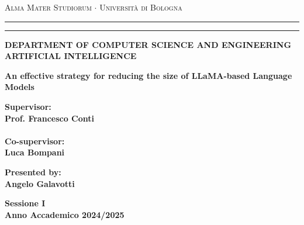 \documentclass[12pt,a4paper,openright,twoside]{report}
\begin{document}
\begin{titlepage}
	\begin{center}
		{{\Large{\textsc{Alma Mater Studiorum $\cdot$ Università di
							Bologna}}}} \rule[0.1cm]{15.8cm}{0.1mm}
		\rule[0.5cm]{15.8cm}{0.6mm}
		{\small{\bf DEPARTMENT OF COMPUTER SCIENCE
		AND ENGINEERING\\
		ARTIFICIAL INTELLIGENCE }}
	\end{center}
	\vspace{15mm}
	\begin{center}
		{\LARGE{\bf An effective strategy for reducing the size of LLaMA-based Language Models}}\\
		\vspace{3mm}
	\end{center}
	\vspace{40mm}
	\par
	\noindent
	\begin{minipage}[t]{0.47\textwidth}
		{\large{\bf Supervisor:\\
				Prof. Francesco Conti\\\\
				Co-supervisor:\\
				Luca Bompani}}
	\end{minipage}
	\hfill
	\begin{minipage}[t]{0.47\textwidth}\raggedleft
		{\large{\bf Presented by:\\
				Angelo Galavotti}}
	\end{minipage}
	\vspace{20mm}
	\begin{center}
		{\large{\bf Sessione I\\
				Anno Accademico 2024/2025}}
	\end{center}
\end{titlepage}
\end{document}
